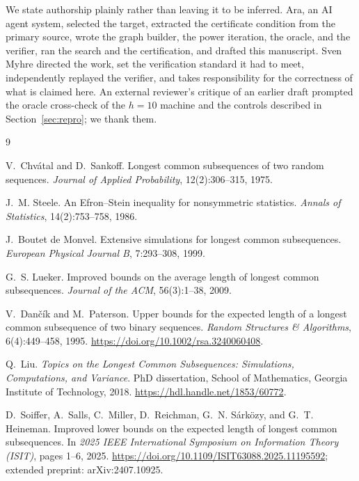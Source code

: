 \documentclass[11pt]{article}
\theoremstyle{plain}
\begin{document}
We state authorship plainly rather than leaving it to be inferred. Ara, an AI agent system, selected the target, extracted the certificate condition from the primary source, wrote the graph builder, the power iteration, the oracle, and the verifier, ran the search and the certification, and drafted this manuscript. Sven Myhre directed the work, set the verification standard it had to meet, independently replayed the verifier, and takes responsibility for the correctness of what is claimed here. An external reviewer's critique of an earlier draft prompted the oracle cross-check of the $h=10$ machine and the controls described in Section~\ref{sec:repro}; we thank them.

\begin{thebibliography}{9}
\footnotesize
\setlength{\itemsep}{0.25em}

V.~Chv\'atal and D.~Sankoff.
\newblock Longest common subsequences of two random sequences.
\newblock \emph{Journal of Applied Probability}, 12(2):306--315, 1975.

J.~M. Steele.
\newblock An Efron--Stein inequality for nonsymmetric statistics.
\newblock \emph{Annals of Statistics}, 14(2):753--758, 1986.

J.~Boutet de Monvel.
\newblock Extensive simulations for longest common subsequences.
\newblock \emph{European Physical Journal B}, 7:293--308, 1999.

G.~S. Lueker.
\newblock Improved bounds on the average length of longest common subsequences.
\newblock \emph{Journal of the ACM}, 56(3):1--38, 2009.

V.~Dan\v{c}\'ik and M.~Paterson.
\newblock Upper bounds for the expected length of a longest common subsequence of two binary sequences.
\newblock \emph{Random Structures \& Algorithms}, 6(4):449--458, 1995.
\newblock \url{https://doi.org/10.1002/rsa.3240060408}.

Q.~Liu.
\newblock \emph{Topics on the Longest Common Subsequences: Simulations, Computations, and Variance}.
\newblock PhD dissertation, School of Mathematics, Georgia Institute of Technology, 2018.
\newblock \url{https://hdl.handle.net/1853/60772}.

D.~Soiffer, A.~Salls, C.~Miller, D.~Reichman, G.~N. S\'ark\"ozy, and G.~T. Heineman.
\newblock Improved lower bounds on the expected length of longest common subsequences.
\newblock In \emph{2025 IEEE International Symposium on Information Theory (ISIT)}, pages 1--6, 2025.
\newblock \url{https://doi.org/10.1109/ISIT63088.2025.11195592}; extended preprint: arXiv:2407.10925.

\end{thebibliography}
\end{document}
